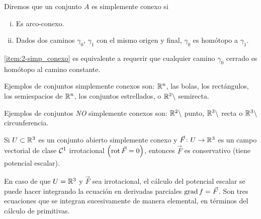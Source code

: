 \begin{defi}
    Diremos que un conjunto $A$ es simplemente conexo si
    \begin{enumerate}[i)]
        \item Es arco-conexo.
        \item\label{item:2-simp_conexo} Dados dos caminos $\gamma_0$, $\gamma_1$ con el mismo origen y final,
            $\gamma_0$ es hom\'otopo a $\gamma_1$.
    \end{enumerate}
\end{defi}

\begin{obs*}
    \ref{item:2-simp_conexo} es equivalente a requerir que cualquier camino $\gamma_0$ cerrado es homótopo al camino
    constante.
\end{obs*}

\begin{obs}
    Ejemplos de conjuntos simplemente conexos son: $\mathbb{R}^n$, las bolas, los rectángulos, los semiespacios de $\mathbb{R}^n$,
    los conjuntos estrellados, o $\mathbb{R}^2 \setminus$ semirecta.

    Ejemplos de conjuntos \emph{NO} simplemente conexos son: $\mathbb{R}^2 \setminus$ punto, $\mathbb{R}^3 \setminus$ recta o
    $\mathbb{R}^3 \setminus$ circunferencia.
\end{obs}

\begin{prop}
    Si $U \subset \mathbb{R}^3$ es un conjunto abierto simplemente conexo y $\vec{F} \colon U \to \mathbb{R}^3$ es un campo vectorial
    de clase $\mathcal{C}^1$ irrotacional $\left( \operatorname{rot} \vec{F} = 0 \right)$, entonces $\vec{F}$ es conservativo (tiene potencial
    escalar).
\end{prop}

\begin{obs}
    En caso de que $U = \mathbb{R}^3$ y $\vec{F}$ sea irrotacional, el cálculo del potencial escalar se puede hacer integrando
    la ecuación en derivadas parciales $\operatorname{grad} f = \vec{F}$. Son tres ecuaciones que se integran sucesivamente de manera
    elemental, en términos del cálculo de primitivas.
\end{obs}


